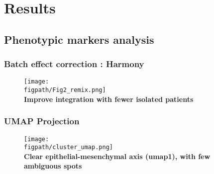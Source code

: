 \documentclass[aspectratio=169]{beamer}
\newcommand{\figpath}{/mnt/datadisk/Jordan/Delivrables/Rapports/Rapport_stage/Figures/Sans_légendes}
\begin{document}
\section{Results}
\subsection{Phenotypic markers analysis}


\begin{comment} 
\begin{frame} %
    \centering
    \vspace{2cm}
    {\LARGE \textbf{Results}}\\[1.5em]
    
    {\Large Part I: Phenotypic Marker Analysis}\\[0.8em]
    {\Large Part II: CNA Analysis}
\end{frame}
\end{comment}

\begin{frame}
	\frametitle<presentation>{Batch effect correction : Harmony}
	\begin{figure}
		\centering
			\texttt{[image: \\figpath/Fig2\_remix.png]}\\
            \centering
            \textbf{Improve integration with fewer isolated patients}
		\label{fig:harmony_tumor_cell_types}
	\end{figure}
\end{frame}

\begin{frame}
	\frametitle<presentation>{UMAP Projection}
	\begin{figure}
		    \centering
			\texttt{[image: \\figpath/cluster\_umap.png]}\\
            \centering
            \textbf{Clear epithelial-mesenchymal axis (umap1), with few ambiguous spots}
            \label{fig:umap}
	\end{figure}
\end{frame}
\end{document}
